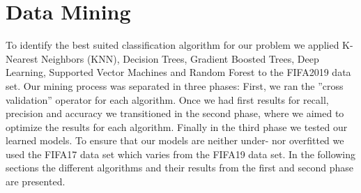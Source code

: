 \documentclass[runningheads]{llncs}
\begin{document}
\section{Data Mining}
\label{sec:DM}
To identify the best suited classification algorithm for our problem we applied K-Nearest Neighbors (KNN), Decision Trees, Gradient Boosted Trees, Deep Learning, Supported Vector Machines and Random Forest to the FIFA2019 data set.
Our mining process was separated in three phases: First, we ran the ''cross validation'' operator for each algorithm. Once we had first results for recall, precision and accuracy we transitioned in the second phase, where we aimed to optimize the results for each algorithm. Finally in the third phase we tested our learned models. To ensure that our models are neither under- nor overfitted we used the FIFA17 data set which varies from the FIFA19 data set.
In the following sections the different algorithms and their results from the first and second phase are presented.











\newpage
%
%
\end{document}

